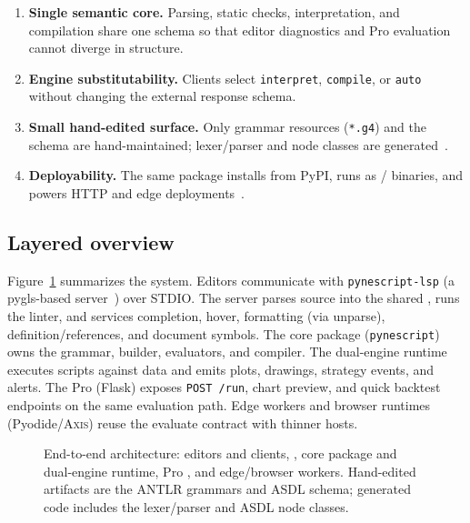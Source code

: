 \documentclass[11pt,a4paper]{article}
\begin{document}
\begin{enumerate}[leftmargin=1.4em]
  \item \textbf{Single semantic core.}
    Parsing, static checks, interpretation, and compilation share one \ast{}
    schema so that editor diagnostics and Pro evaluation cannot diverge in
    structure.
  \item \textbf{Engine substitutability.}
    Clients select \texttt{interpret}, \texttt{compile}, or \texttt{auto}
    without changing the external response schema.
  \item \textbf{Small hand-edited surface.}
    Only grammar resources (\texttt{*.g4}) and the \asdl{} schema are
    hand-maintained; lexer/parser and node classes are generated~\citep{parr2013antlr,wang1997asdl}.
  \item \textbf{Deployability.}
    The same package installs from PyPI, runs as \cli{}/\lsp{} binaries, and
    powers HTTP and edge deployments~\citep{hoox2026}.
\end{enumerate}

\subsection{Layered overview}
\label{sec:layers}

Figure~\ref{fig:architecture} summarizes the system.
Editors communicate with \texttt{pynescript-lsp} (a pygls-based
server~\citep{murphy2020pygls,lsp2023}) over STDIO.
The server parses source into the shared \ast{}, runs the linter, and
services completion, hover, formatting (via unparse), definition/references,
and document symbols.
The core package (\texttt{pynescript}) owns the grammar, \ast{} builder,
evaluators, and compiler.
The dual-engine runtime executes scripts against \ohlcv{} data and emits
plots, drawings, strategy events, and alerts.
The Pro \api{} (Flask) exposes \texttt{POST /run}, chart preview, and quick
backtest endpoints on the same evaluation path.
Edge workers and browser runtimes (Pyodide/\textsc{Axis}) reuse the evaluate
contract with thinner hosts.

\begin{figure}[t]
  \centering
  \resizebox{\textwidth}{!}{}
  \caption{End-to-end \pyne{} architecture: editors and clients, \lsp{},
  core package and dual-engine runtime, Pro \api{}, and edge/browser workers.
  Hand-edited artifacts are the ANTLR grammars and ASDL schema; generated
  code includes the lexer/parser and ASDL node classes.}
  \label{fig:architecture}
\end{figure}
\end{document}

